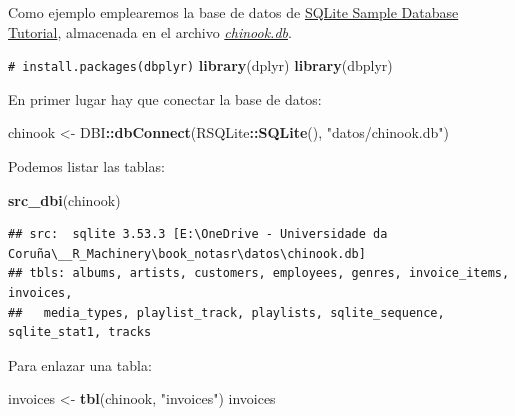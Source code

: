 \documentclass[
]{book}
\newenvironment{Shaded}{\begin{snugshade}}{\end{snugshade}}
\newcommand{\CommentTok}[1]{\textcolor[rgb]{0.56,0.35,0.01}{\textit{#1}}}
\newcommand{\FunctionTok}[1]{\textcolor[rgb]{0.13,0.29,0.53}{\textbf{#1}}}
\newcommand{\NormalTok}[1]{#1}
\newcommand{\OtherTok}[1]{\textcolor[rgb]{0.56,0.35,0.01}{#1}}
\newcommand{\SpecialCharTok}[1]{\textcolor[rgb]{0.81,0.36,0.00}{\textbf{#1}}}
\newcommand{\StringTok}[1]{\textcolor[rgb]{0.31,0.60,0.02}{#1}}
\theoremstyle{break}
\theoremstyle{nonumberplain}
\renewcommand{\CommentTok}[1]{\textcolor[rgb]{0.41,0.41,0.41}{\texttt{#1}}}
\begin{document}
Como ejemplo emplearemos la base de datos de \href{https://www.sqlitetutorial.net/sqlite-sample-database/}{SQLite Sample Database Tutorial}, almacenada en el archivo \href{datos/chinook.db}{\emph{chinook.db}}.

\begin{Shaded}
\begin{Highlighting}[]
\CommentTok{\# install.packages(\textquotesingle{}dbplyr\textquotesingle{})}
\FunctionTok{library}\NormalTok{(dplyr)}
\FunctionTok{library}\NormalTok{(dbplyr)}
\end{Highlighting}
\end{Shaded}

En primer lugar hay que conectar la base de datos:

\begin{Shaded}
\begin{Highlighting}[]
\NormalTok{chinook }\OtherTok{\textless{}{-}}\NormalTok{ DBI}\SpecialCharTok{::}\FunctionTok{dbConnect}\NormalTok{(RSQLite}\SpecialCharTok{::}\FunctionTok{SQLite}\NormalTok{(), }\StringTok{"datos/chinook.db"}\NormalTok{)}
\end{Highlighting}
\end{Shaded}

Podemos listar las tablas:

\begin{Shaded}
\begin{Highlighting}[]
\FunctionTok{src\_dbi}\NormalTok{(chinook)}
\end{Highlighting}
\end{Shaded}

\begin{verbatim}
## src:  sqlite 3.53.3 [E:\OneDrive - Universidade da Coruña\__R_Machinery\book_notasr\datos\chinook.db]
## tbls: albums, artists, customers, employees, genres, invoice_items, invoices,
##   media_types, playlist_track, playlists, sqlite_sequence, sqlite_stat1, tracks
\end{verbatim}

Para enlazar una tabla:

\begin{Shaded}
\begin{Highlighting}[]
\NormalTok{invoices }\OtherTok{\textless{}{-}} \FunctionTok{tbl}\NormalTok{(chinook, }\StringTok{"invoices"}\NormalTok{)}
\NormalTok{invoices}
\end{Highlighting}
\end{Shaded}
\end{document}
